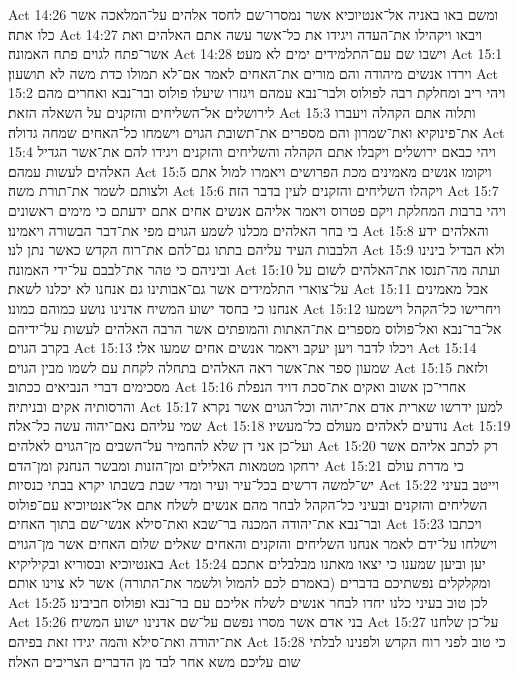Act 14:26  ומשם באו באניה אל־אנטיוכיא אשר נמסרו־שם לחסד אלהים על־המלאכה אשר כלו אתה׃
Act 14:27  ויבאו ויקהילו את־העדה ויגידו את כל־אשר עשה אתם האלהים ואת אשר־פתח לגוים פתח האמונה׃
Act 14:28  וישבו שם עם־התלמידים ימים לא מעט׃
Act 15:1  וירדו אנשים מיהודה והם מורים את־האחים לאמר אם־לא תמולו כדת משה לא תושעון׃
Act 15:2  ויהי ריב ומחלקת רבה לפולוס ולבר־נבא עמהם ויגזרו שיעלו פולוס ובר־נבא ואחרים מהם לירושלים אל־השליחים והזקנים על השאלה הזאת׃
Act 15:3  ותלוה אתם הקהלה ויעברו את־פינוקיא ואת־שמרון והם מספרים את־תשובת הגוים וישמחו כל־האחים שמחה גדולה׃
Act 15:4  ויהי כבאם ירושלים ויקבלו אתם הקהלה והשליחים והזקנים ויגידו להם את־אשר הגדיל האלהים לעשות עמהם׃
Act 15:5  ויקומו אנשים מאמינים מכת הפרושים ויאמרו למול אתם ולצותם לשמר את־תורת משה׃
Act 15:6  ויקהלו השליחים והזקנים לעין בדבר הזה׃
Act 15:7  ויהי ברבות המחלקת ויקם פטרוס ויאמר אליהם אנשים אחים אתם ידעתם כי מימים ראשונים בי בחר האלהים מכלנו לשמע הגוים מפי את־דבר הבשורה ויאמינו׃
Act 15:8  והאלהים ידע הלבבות העיד עליהם בתתו גם־להם את־רוח הקדש כאשר נתן לנו׃
Act 15:9  ולא הבדיל בינינו וביניהם כי טהר את־לבבם על־ידי האמונה׃
Act 15:10  ועתה מה־תנסו את־האלהים לשום על על־צוארי התלמידים אשר גם־אבותינו גם אנחנו לא יכלנו לשאת׃
Act 15:11  אבל מאמינים אנחנו כי בחסד ישוע המשיח אדנינו נושע כמוהם כמונו׃
Act 15:12  ויחרישו כל־הקהל וישמעו אל־בר־נבא ואל־פולוס מספרים את־האתות והמופתים אשר הרבה האלהים לעשות על־ידיהם בקרב הגוים׃
Act 15:13  ויכלו לדבר ויען יעקב ויאמר אנשים אחים שמעו אלי׃
Act 15:14  שמעון ספר את־אשר ראה האלהים בתחלה לקחת עם לשמו מבין הגוים׃
Act 15:15  ולזאת מסכימים דברי הנביאים ככתוב׃
Act 15:16  אחרי־כן אשוב ואקים את־סכת דויד הנפלת והרסותיה אקים ובניתיה׃
Act 15:17  למען ידרשו שארית אדם את־יהוה וכל־הגוים אשר נקרא שמי עליהם נאם־יהוה עשה כל־אלה׃
Act 15:18  נודעים לאלהים מעולם כל־מעשיו׃
Act 15:19  ועל־כן אני דן שלא להחמיר על־השבים מן־הגוים לאלהים׃
Act 15:20  רק לכתב אליהם אשר ירחקו מטמאות האלילים ומן־הזנות ומבשר הנחנק ומן־הדם׃
Act 15:21  כי מדרת עולם יש־למשה דרשים בכל־עיר ועיר ומדי שבת בשבתו יקרא בבתי כנסיות׃
Act 15:22  וייטב בעיני השליחים והזקנים ובעיני כל־הקהל לבחר מהם אנשים לשלח אתם אל־אנטיוכיא עם־פולוס ובר־נבא את־יהודה המכנה בר־שבא ואת־סילא אנשי־שם בתוך האחים׃
Act 15:23  ויכתבו וישלחו על־ידם לאמר אנחנו השליחים והזקנים והאחים שאלים שלום האחים אשר מן־הגוים באנטיוכיא ובסוריא ובקיליקיא׃
Act 15:24  יען וביען שמענו כי יצאו מאתנו מבלבלים אתכם ומקלקלים נפשתיכם בדברים (באמרם לכם להמול ולשמר את־התורה) אשר לא צוינו אותם׃
Act 15:25  לכן טוב בעיני כלנו יחדו לבחר אנשים לשלח אליכם עם בר־נבא ופולוס חביבינו׃
Act 15:26  בני אדם אשר מסרו נפשם על־שם אדנינו ישוע המשיח׃
Act 15:27  על־כן שלחנו את־יהודה ואת־סילא והמה יגידו זאת בפיהם׃
Act 15:28  כי טוב לפני רוח הקדש ולפנינו לבלתי שום עליכם משא אחר לבד מן הדברים הצריכים האלה׃
